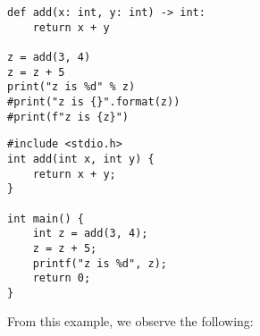 \noindent
\begin{minipage}{0.40\textwidth}
    \begin{verbatim}
def add(x: int, y: int) -> int:
    return x + y

z = add(3, 4)
z = z + 5
print("z is %d" % z)
#print("z is {}".format(z))
#print(f"z is {z}")
    \end{verbatim}
\end{minipage}%
\hfill%
\begin{minipage}{0.35\textwidth}
    \begin{verbatim}
#include <stdio.h>
int add(int x, int y) {
    return x + y;
}

int main() {
    int z = add(3, 4);
    z = z + 5;
    printf("z is %d", z);
    return 0;
}
    \end{verbatim}
\end{minipage}
\newpage
From this example, we observe the following:
